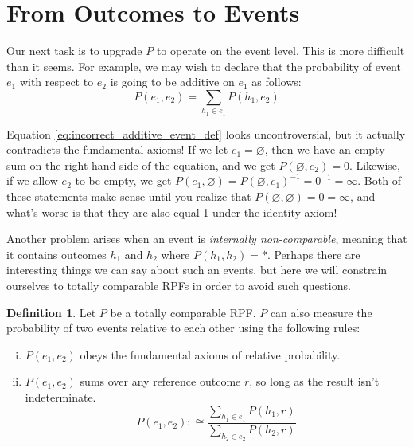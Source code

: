 \documentclass[twoside]{article}
\theoremstyle{plain}%
\theoremstyle{definition}
\newtheorem{definition}{Definition}[section]
\theoremstyle{remark}
\begin{document}
\section{From Outcomes to Events}

Our next task is to upgrade \(P\) to operate on the event level. This is more difficult than it seems. For example, we may wish to declare that the probability of event \(e_1\) with respect to \(e_2\) is going to be additive on \(e_1\) as follows:
\begin{equation}
\label{eq:incorrect_additive_event_def}
P(e_1, e_2) = \sum_{h_1 \in e_1}P(h_1, e_2)
\end{equation}

Equation \ref{eq:incorrect_additive_event_def} looks uncontroversial, but it actually contradicts the fundamental axioms! If we let \(e_1 = \varnothing\), then we have an empty sum on the right hand side of the equation, and we get \(P(\varnothing, e_2) = 0\). Likewise, if we allow \(e_2\) to be empty, we get \(P(e_1, \varnothing) = P(\varnothing, e_1)^{-1}=0^{-1}=\infty\). Both of these statements make sense until you realize that \(P(\varnothing, \varnothing) = 0 = \infty\), and what's worse is that they are also equal 1 under the identity axiom!

Another problem arises when an event is \textit{internally non-comparable}, meaning that it contains outcomes \(h_1\) and \(h_2\) where \(P(h_1, h_2) = \ast\). Perhaps there are interesting things we can say about such an events, but here we will constrain ourselves to totally comparable RPFs in order to avoid such questions.

\begin{definition}
Let \(P\) be a totally comparable RPF. \(P\) can also measure the probability of two events relative to each other using the following rules:

\begin{enumerate}[(i)]
  \item \label{event_def_1} \(P(e_1, e_2)\) obeys the fundamental axioms of relative probability.
  \item \label{event_def_2} \(P(e_1, e_2)\) sums over any reference outcome \(r\), so long as the result isn't indeterminate.
    \begin{equation}
      \label{eq:event_def_ratio_match}
      P(e_1, e_2) :\cong \frac{\sum_{h_1 \in e_1} P(h_1, r)}{\sum_{h_2 \in e_2} P(h_2, r)}
    \end{equation}
\end{enumerate}
\end{definition}
\end{document}
